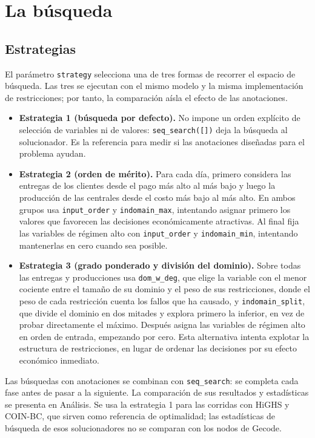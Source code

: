 \section{La búsqueda}

\subsection{Estrategias}

El parámetro \texttt{strategy} selecciona una de tres formas de recorrer el espacio de búsqueda. Las tres se ejecutan con el mismo modelo y la misma implementación de restricciones; por tanto, la comparación aísla el efecto de las anotaciones.

\begin{itemize}
    \item \textbf{Estrategia 1 (búsqueda por defecto).} No impone un orden explícito de selección de variables ni de valores: \texttt{seq\_search([])} deja la búsqueda al solucionador. Es la referencia para medir si las anotaciones diseñadas para el problema ayudan.
    \item \textbf{Estrategia 2 (orden de mérito).} Para cada día, primero considera las entregas de los clientes desde el pago más alto al más bajo y luego la producción de las centrales desde el costo más bajo al más alto. En ambos grupos usa \texttt{input\_order} y \texttt{indomain\_max}, intentando asignar primero los valores que favorecen las decisiones económicamente atractivas. Al final fija las variables de régimen alto con \texttt{input\_order} y \texttt{indomain\_min}, intentando mantenerlas en cero cuando sea posible.
    \item \textbf{Estrategia 3 (grado ponderado y división del dominio).} Sobre todas las entregas y producciones usa \texttt{dom\_w\_deg}, que elige la variable con el menor cociente entre el tamaño de su dominio y el peso de sus restricciones, donde el peso de cada restricción cuenta los fallos que ha causado, y \texttt{indomain\_split}, que divide el dominio en dos mitades y explora primero la inferior, en vez de probar directamente el máximo. Después asigna las variables de régimen alto en orden de entrada, empezando por cero. Esta alternativa intenta explotar la estructura de restricciones, en lugar de ordenar las decisiones por su efecto económico inmediato.
\end{itemize}

Las búsquedas con anotaciones se combinan con \texttt{seq\_search}: se completa cada fase antes de pasar a la siguiente. La comparación de sus resultados y estadísticas se presenta en Análisis. Se usa la estrategia 1 para las corridas con HiGHS y COIN-BC, que sirven como referencia de optimalidad; las estadísticas de búsqueda de esos solucionadores no se comparan con los nodos de Gecode.

